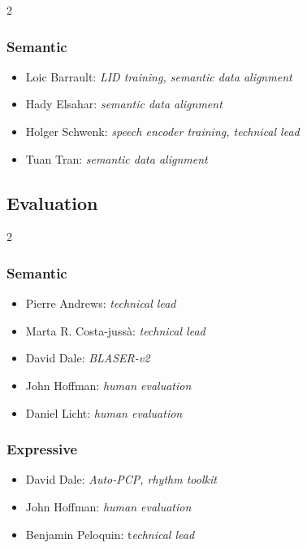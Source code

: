 \begin{multicols}{2}
\columnbreak

\subsubsection*{Semantic}
\begin{itemize}[itemsep=0.00cm,parsep=0.0cm,left=0pt, label={}]
\item Loic Barrault: \textit{LID training, semantic data alignment}
\item Hady Elsahar: \textit{semantic data alignment}
\item Holger Schwenk: \textit{speech encoder training, technical lead}
\item Tuan Tran: \textit{semantic data alignment}
\end{itemize}

\end{multicols}

\vspace{10pt}

\subsection*{Evaluation}
\begin{multicols}{2}

\subsubsection*{Semantic}
\begin{itemize}[itemsep=0.00cm,parsep=0.0cm,left=0pt, label={}]
\item Pierre Andrews: \textit{technical lead}
\item Marta R. Costa-jussà: \textit{technical lead}
\item David Dale: \textit{BLASER-v2}
\item John Hoffman: \textit{human evaluation}
\item Daniel Licht: \textit{human evaluation}
\end{itemize}
\columnbreak

\subsubsection*{Expressive}
\begin{itemize}[itemsep=0.00cm,parsep=0.0cm,left=0pt, label={}]
\item David Dale:  \textit{Auto-PCP, rhythm toolkit}
\item John Hoffman: \textit{human evaluation}
\item Benjamin Peloquin: t\textit{echnical lead}
\end{itemize}

\end{multicols}

